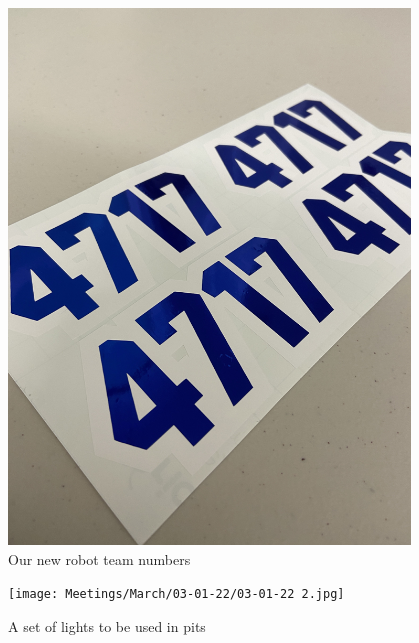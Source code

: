 \begin{figure}[htp]
\centering
\includegraphics[width=0.95\textwidth, angle=0]{Meetings/March/03-01-22/03-01-22 1.jpg}
\caption{Our new robot team numbers}
\label{fig:030122_1}
\end{figure}

\begin{figure}[htp]
\centering
\texttt{[image: Meetings/March/03-01-22/03-01-22 2.jpg]}
\caption{A set of lights to be used in pits}
\label{fig:030122_2}
\end{figure}

